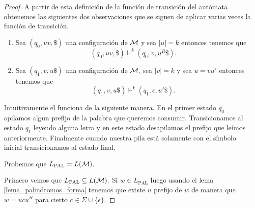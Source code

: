 \documentclass[tesis.tex]{subfiles}
\begin{document}
\begin{proof}
	A partir de esta definición de la función de transición del autómata obtenemos las siguientes dos observaciones que se siguen de aplicar varias veces la función de transición.
	
	\begin{enumerate}
		\item 
		Sea $(q_{0},uv, \$)$ una configuración de $\cal M$ y sea $|u| = k$ entonces tenemos que 
		\[
			(q_{0},uv, \$) \vdash^k (q_{0}, v, u^R \$).
		\]
		
		\item Sea $(q_{1},v, u\$)$ una configuración de $\cal M$, sea $|v| = k$ y 
		sea $u = vu'$  entonces tenemos que 
		\[
		(q_{1},v, u\$) \vdash^k (q_{1}, \epsilon, u' \$).
		\]
	\end{enumerate}
	
	
	Intuitivamente el \APND funciona de la siguiente manera. 
	En el primer estado $q_{0}$ apilamos algun prefijo de la palabra que queremos consumir.
	Transicionamos al estado $q_{1}$ leyendo alguna letra y en este estado desapilamos el prefijo que leímos anteriormente.
	Finalmente cuando nuestra pila está solamente con el símbolo inicial transicionamos	al estado final.
	
	Probemos que $L_{\text{PAL}} = L(\cal M)$.
	
	Primero vemos que $L_{\text{PAL}} \subseteq L(\cal M)$.
	Si $w \in L_{\text{PAL}}$ luego usando el lema \ref{lema_palindromos_forma}
	tenemos que existe $u$ prefijo de $w$ de manera que
	$w = ucu^R$ para cierto $c \in \Sigma \cup \{ \epsilon\}$.
	

\end{proof}
\end{document}
